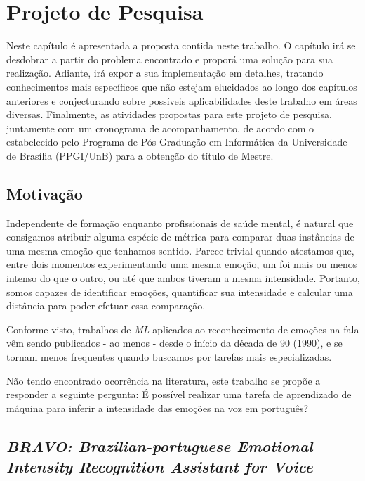 \chapter{Projeto de Pesquisa}\label{Cap:Projeto de Pesquisa}

Neste capítulo é apresentada a proposta contida neste trabalho. O capítulo irá se desdobrar a partir do problema encontrado e proporá uma solução para sua realização. Adiante, irá expor a sua implementação em detalhes, tratando conhecimentos mais específicos que não estejam elucidados ao longo dos capítulos anteriores e conjecturando sobre possíveis aplicabilidades deste trabalho em áreas diversas. Finalmente, as atividades propostas para este projeto de pesquisa, juntamente com um cronograma de acompanhamento, de acordo com o estabelecido pelo Programa de Pós-Graduação em Informática da Universidade de Brasília (PPGI/UnB) para a obtenção do título de Mestre.\\

\section{Motivação}

Independente de formação enquanto profissionais de saúde mental, é natural que consigamos atribuir alguma espécie de métrica para comparar duas instâncias de uma mesma emoção que tenhamos sentido. Parece trivial quando atestamos que, entre dois momentos experimentando uma mesma emoção, um foi mais ou menos intenso do que o outro, ou até que ambos tiveram a mesma intensidade. Portanto, somos capazes de identificar emoções, quantificar sua intensidade e calcular uma distância para poder efetuar essa comparação.

Conforme visto, trabalhos de \textit{ML} aplicados ao reconhecimento de emoções na fala vêm sendo publicados - ao menos - desde o início da década de 90 (1990), e se tornam menos frequentes quando buscamos por tarefas mais especializadas.

Não tendo encontrado ocorrência na literatura, este trabalho se propõe a responder a seguinte pergunta: É possível realizar uma tarefa de aprendizado de máquina para inferir a intensidade das emoções na voz em português?

\section{\textit{BRAVO: Brazilian-portuguese Emotional Intensity Recognition Assistant for Voice}}

